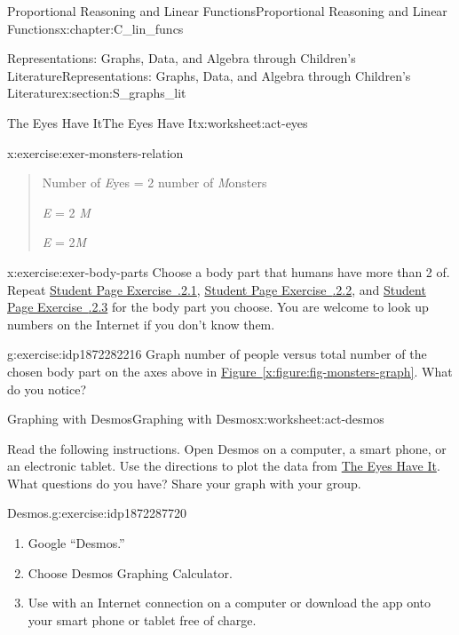 \documentclass[oneside,10pt,]{book}
\newcommand{\xreffont}{\relax}
\numberwithin{equation}{chapter}
\begin{document}
\begin{chapterptx}{Proportional Reasoning and Linear Functions}{}{Proportional Reasoning and Linear Functions}{}{}{x:chapter:C_lin_funcs}
\begin{sectionptx}{Representations: Graphs, Data, and Algebra through Children's Literature}{}{Representations: Graphs, Data, and Algebra through Children's Literature}{}{}{x:section:S_graphs_lit}
\begin{worksheet-subsection}{The Eyes Have It}{}{The Eyes Have It}{}{}{x:worksheet:act-eyes}
\begin{divisionexercise}{3}{}{}{x:exercise:exer-monsters-relation}
\begin{quote}
\par
Number of \emph{E}yes = 2 \texttimes{} number of \emph{M}onsters%
\par
\emph{E} = 2 \texttimes{} \emph{M}%
\par
\emph{E} = 2\emph{M}%
\end{quote}
%
\end{divisionexercise}%
\begin{divisionexercise}{4}{}{}{x:exercise:exer-body-parts}%
Choose a body part that humans have more than 2 of. Repeat \hyperlink{x:exercise:exer-monsters-1}{Student Page Exercise~{\xreffont 2.1.2.1}}, \hyperlink{x:exercise:exer-monsters-graph}{Student Page Exercise~{\xreffont 2.1.2.2}}, and \hyperlink{x:exercise:exer-monsters-relation}{Student Page Exercise~{\xreffont 2.1.2.3}} for the body part you choose. You are welcome to look up numbers on the Internet if you don't know them.%
\end{divisionexercise}%
\begin{divisionexercise}{5}{}{}{g:exercise:idp1872282216}%
Graph number of people versus total number of the chosen body part on the axes above in \hyperref[x:figure:fig-monsters-graph]{Figure~{\xreffont\ref{x:figure:fig-monsters-graph}}}. What do you notice?%
\end{divisionexercise}%
\end{worksheet-subsection}
\restoregeometry
%
%
\typeout{************************************************}
\typeout{************************************************}
%
\begin{worksheet-subsection}{Graphing with Desmos}{}{Graphing with Desmos}{}{}{x:worksheet:act-desmos}
\begin{introduction}{}%
Read the following instructions. Open Desmos on a computer, a smart phone, or an electronic tablet. Use the directions to plot the data from \hyperref[x:worksheet:act-eyes]{The Eyes Have It}. What questions do you have? Share your graph with your group.%
\end{introduction}%
\begin{divisionexercise}{1}{Desmos.}{}{g:exercise:idp1872287720}%
\begin{enumerate}[font=\bfseries,label=(\alph*),ref=\alph*]
\item{}Google ``Desmos.''%
\item{}Choose Desmos Graphing Calculator.%
\item{}Use with an Internet connection on a computer or download the app onto your smart phone or tablet free of charge.%

\end{enumerate}
\end{divisionexercise}
\end{worksheet-subsection}
\end{sectionptx}
\end{chapterptx}
\end{document}
